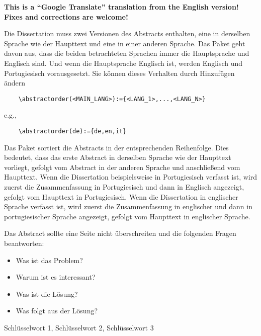 
%

\textbf{This is a “Google Translate” translation from the English version!  Fixes and corrections are welcome!}

Die Dissertation muss zwei Versionen des Abstracts enthalten, eine in derselben Sprache wie der Haupttext und eine in einer anderen Sprache. Das Paket geht davon aus, dass die beiden betrachteten Sprachen immer die Hauptsprache und Englisch sind. Und wenn die Hauptsprache Englisch ist, werden Englisch und Portugiesisch vorausgesetzt. Sie können dieses Verhalten durch Hinzufügen ändern
\begin{verbatim}
    \abstractorder(<MAIN_LANG>):={<LANG_1>,...,<LANG_N>}
\end{verbatim}
\noindent e.g.,
\begin{verbatim}
    \abstractorder(de):={de,en,it}
\end{verbatim}

Das Paket sortiert die Abstracts in der entsprechenden Reihenfolge. Dies bedeutet, dass das erste Abstract in derselben Sprache wie der Haupttext vorliegt, gefolgt vom Abstract in der anderen Sprache und anschließend vom Haupttext. Wenn die Dissertation beispielsweise in Portugiesisch verfasst ist, wird zuerst die Zusammenfassung in Portugiesisch und dann in Englisch angezeigt, gefolgt vom Haupttext in Portugiesisch. Wenn die Dissertation in englischer Sprache verfasst ist, wird zuerst die Zusammenfassung in englischer und dann in portugiesischer Sprache angezeigt, gefolgt vom Haupttext in englischer Sprache.

Das Abstract sollte eine Seite nicht überschreiten und die folgenden Fragen beantworten:

\begin{itemize}
  \item Was ist das Problem?
  \item Warum ist es interessant?
  \item Was ist die Lösung?
  \item Was folgt aus der Lösung?
\end{itemize}

\begin{keywords}
Schlüsselwort 1, Schlüsselwort 2, Schlüsselwort 3
\end{keywords} 
